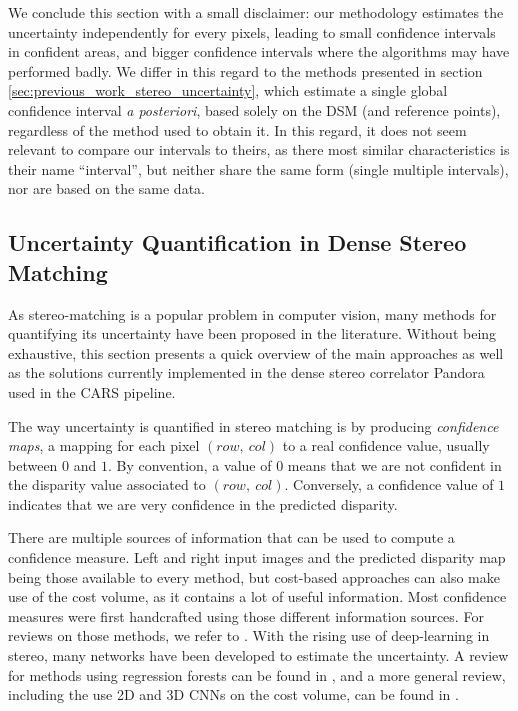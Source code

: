 We conclude this section with a small disclaimer: our methodology estimates the uncertainty independently for every pixels, leading to small confidence intervals in confident areas, and bigger confidence intervals where the algorithms may have performed badly. We differ in this regard to the methods presented in section \ref{sec:previous_work_stereo_uncertainty}, which estimate a single global confidence interval \textit{a posteriori}, based solely on the DSM (and reference points), regardless of the method used to obtain it. In this regard, it does not seem relevant to compare our intervals to theirs, as there most similar characteristics is their name ``interval'', but neither share the same form (single \vs multiple intervals), nor are based on the same data.

\subsection{Uncertainty Quantification in Dense Stereo Matching}\label{sec:uncertainty_pandora}
As stereo-matching is a popular problem in computer vision, many methods for quantifying its uncertainty have been proposed in the literature. Without being exhaustive, this section presents a quick overview of the main approaches as well as the solutions currently implemented in the dense stereo correlator Pandora used in the CARS pipeline.

The way uncertainty is quantified in stereo matching is by producing \textit{confidence maps}, \ie a mapping for each pixel $(row, ~col)$ to a real confidence value, usually between $0$ and $1$. By convention, a value of $0$ means that we are not confident in the disparity value associated to $(row, ~col)$. Conversely, a confidence value of $1$ indicates that we are very confidence in the predicted disparity.

There are multiple sources of information that can be used to compute a confidence measure. Left and right input images and the predicted disparity map being those available to every method, but cost-based approaches can also make use of the cost volume, as it contains a lot of useful information. Most confidence measures were first handcrafted using those different information sources. For reviews on those methods, we refer to \cite{egnal_stereo_2004, hu_quantitative_2012, poggi_quantitative_2017}. With the rising use of deep-learning in stereo, many networks have been developed to estimate the uncertainty. A review for methods using regression forests can be found in \cite{min-gyu_park_leveraging_2015}, and a more general review, including the use 2D and 3D CNNs on the cost volume, can be found in \cite{poggi_confidence_2021}.

